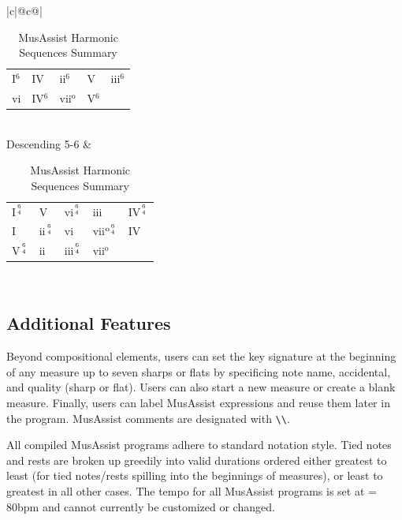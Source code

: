 \documentclass{article}
\newlength{\maxcollen}
\begin{document}
\begin{table}[h!]
\begin{center}
\begin{tabular}{|c|@{}c@{}|}
\begin{tabular}{p{\maxcollen}p{\maxcollen}p{\maxcollen}p{\maxcollen}p{\maxcollen}}
                      I$^6$ & IV     & ii$^6$          & V                 & iii$^6$  \\ \hdashline 
                      vi    & IV$^6$ & vii$^\text{o}$  & V$^6$           
                    \end{tabular} \\ \hline
  Descending 5-6    & \renewcommand{\arraystretch}{1.5}
                    \begin{tabular}{p{\maxcollen}p{\maxcollen}p{\maxcollen}p{\maxcollen}p{\maxcollen}} 
                      I$^{6 \atop 4}$ & V                & vi$^{6 \atop 4}$ & iii                         & IV$^{6 \atop 4}$ \\ \hdashline 
                      I               & ii$^{6 \atop 4}$ & vi               & vii$^{\text{o}{6 \atop 4}}$ & IV               \\ \hdashline 
                      V$^{6 \atop 4}$  & ii               & iii$^{6 \atop 4}$           & vii$^\text{o}$  
                    \end{tabular} \\ \hline
  \end{tabular}
  
  \caption{MusAssist Harmonic Sequences Summary\label{table:harmseq}}
  
\end{center}

\end{table}

\vspace{-8mm}
\subsection{Additional Features}
Beyond compositional elements, users can set the key signature at the beginning
of any measure up to seven sharps or flats by specificing note name, accidental, and quality (sharp or flat).
Users can also start a new measure or create a blank measure. Finally,
users can label MusAssist expressions and reuse them later in the program. MusAssist
comments are designated with \verb!\\!.

All compiled MusAssist programs adhere to standard notation style. Tied notes and rests 
are broken up greedily into valid durations ordered either greatest to least (for tied
notes/rests spilling into the beginnings of measures), or least to greatest in all
other cases. The tempo for all MusAssist programs
is set at \musQuarter\;= 80bpm and cannot currently be customized or changed.
\end{document}
